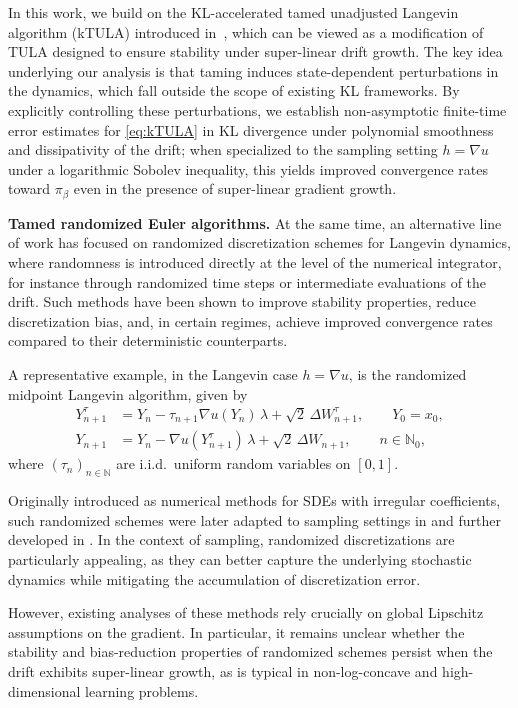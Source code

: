 \documentclass[11pt,a4paper,reqno]{amsart}
\theoremstyle{plain}
\theoremstyle{definition}
\theoremstyle{remark}
\begin{document}
In this work, we build on the KL-accelerated tamed unadjusted Langevin algorithm (kTULA) introduced in~\cite{lytras2025ktula}, which can be viewed as a modification of TULA designed to ensure stability under super-linear drift growth. The key idea underlying our analysis is that taming induces state-dependent perturbations in the dynamics, which fall outside the scope of existing KL frameworks. By explicitly controlling these perturbations, we establish non-asymptotic finite-time error estimates for \ref{eq:kTULA} in KL divergence under polynomial smoothness and dissipativity of the drift; when specialized to the sampling setting $h = \nabla u$ under a logarithmic Sobolev inequality, this yields improved convergence rates toward $\pi_\beta$ even in the presence of super-linear gradient growth.



\medskip
\textbf{Tamed randomized Euler algorithms.}
At the same time, an alternative line of work has focused on randomized discretization schemes for Langevin dynamics, where randomness is introduced directly at the level of the numerical integrator, for instance through randomized time steps or intermediate evaluations of the drift. Such methods have been shown to improve stability properties, reduce discretization bias, and, in certain regimes, achieve improved convergence rates compared to their deterministic counterparts.

A representative example, in the Langevin case $h = \nabla u$, is the randomized midpoint Langevin algorithm, given by
\[
\begin{aligned}
Y_{n+1}^\tau
&=
Y_n-\tau_{n+1}\nabla u(Y_n)\,\lambda+\sqrt{2}\,\Delta W_{n+1}^\tau,
\qquad Y_0=x_0,\\
Y_{n+1}
&=
Y_n-\nabla u(Y_{n+1}^\tau)\,\lambda+\sqrt{2}\,\Delta W_{n+1},
\qquad n\in\mathbb{N}_0,
\end{aligned}
\]
where $(\tau_n)_{n\in\mathbb{N}}$ are i.i.d.\ uniform random variables on $[0,1]$.

Originally introduced as numerical methods for SDEs with irregular coefficients, such randomized schemes were later adapted to sampling settings in \cite{shen2019randomized} and further developed in
\cite{cao2020complexity,yu2023langevin,chewi2024local,li2025convergence}.
In the context of sampling, randomized discretizations are particularly appealing, as they can better capture the underlying stochastic dynamics while mitigating the accumulation of discretization error.

However, existing analyses of these methods rely crucially on global Lipschitz assumptions on the gradient. In particular, it remains unclear whether the stability and bias-reduction properties of randomized schemes persist when the drift exhibits super-linear growth, as is typical in non-log-concave and high-dimensional learning problems.
\end{document}
